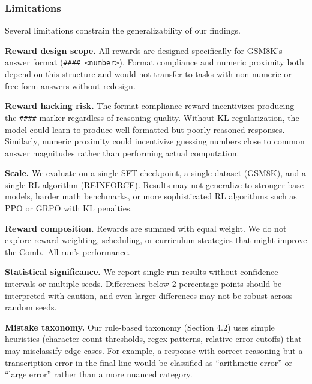 \subsubsection{Limitations}

Several limitations constrain the generalizability of our findings.

\textbf{Reward design scope.}
All rewards are designed specifically for GSM8K's answer format (\texttt{\#\#\#\# <number>}).
Format compliance and numeric proximity both depend on this structure and would not transfer to tasks with non-numeric or free-form answers without redesign.

\textbf{Reward hacking risk.}
The format compliance reward incentivizes producing the \texttt{\#\#\#\#} marker regardless of reasoning quality.
Without KL regularization, the model could learn to produce well-formatted but poorly-reasoned responses.
Similarly, numeric proximity could incentivize guessing numbers close to common answer magnitudes rather than performing actual computation.

\textbf{Scale.}
We evaluate on a single SFT checkpoint, a single dataset (GSM8K), and a single RL algorithm (REINFORCE).
Results may not generalize to stronger base models, harder math benchmarks, or more sophisticated RL algorithms such as PPO or GRPO with KL penalties.

\textbf{Reward composition.}
Rewards are summed with equal weight.
We do not explore reward weighting, scheduling, or curriculum strategies that might improve the Comb.\ All run's performance.

\textbf{Statistical significance.}
We report single-run results without confidence intervals or multiple seeds.
Differences below 2 percentage points should be interpreted with caution, and even larger differences may not be robust across random seeds.

\textbf{Mistake taxonomy.}
Our rule-based taxonomy (Section 4.2) uses simple heuristics (character count thresholds, regex patterns, relative error cutoffs) that may misclassify edge cases.
For example, a response with correct reasoning but a transcription error in the final line would be classified as ``arithmetic error'' or ``large error'' rather than a more nuanced category.
